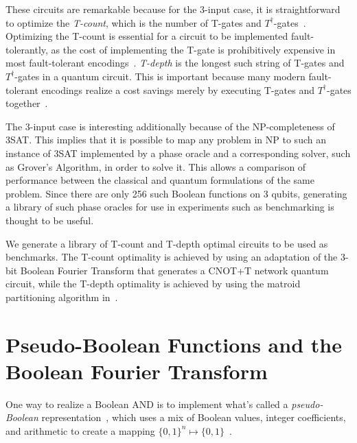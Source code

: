 \documentclass[a4paper]{article}
\begin{document}
These circuits are remarkable because for the 3-input case, it is straightforward to optimize
the {\it T-count}, which is the number of T-gates and $T^{\dagger}$-gates~\cite{bib-amy-meet-in-middle}.
Optimizing the T-count is essential for a circuit to be implemented fault-tolerantly, as
the cost of implementing the T-gate is prohibitively expensive in most fault-tolerant
encodings~\cite{bib-herr-lattice,bib-fowler-bridge}. {\it T-depth} is the longest such
string of T-gates and $T^{\dagger}$-gates in a quantum circuit. This is important because many modern
fault-tolerant encodings realize a cost savings merely by executing T-gates and $T^{\dagger}$-gates
together~\cite{bib-google-ecc}.

The 3-input case is interesting additionally because of the NP-completeness of 3SAT. This implies
that it is possible to map any problem in NP to such an instance of 3SAT implemented by a phase oracle
and a corresponding solver, such as Grover's Algorithm, in order to solve it. This allows a comparison
of performance between the classical and quantum formulations of the same problem. Since there are
only 256 such Boolean functions on 3 qubits, generating a library of such phase oracles for use in
experiments such as benchmarking is thought to be useful.

We generate a library of T-count and T-depth optimal circuits to be used as benchmarks. The T-count
optimality is achieved by using an adaptation of the 3-bit Boolean Fourier Transform that generates
a CNOT+T network quantum circuit, while the T-depth optimality is achieved by using the matroid partitioning
algorithm in~\cite{bib-amy-matroid}.

\section{Pseudo-Boolean Functions and the Boolean Fourier Transform}

One way to realize a Boolean AND is to implement what's called a {\it pseudo-Boolean}
representation~\cite{bib-barenco-elementary,bib-amy-cnot}, which uses a mix of
Boolean values, integer coefficients, and arithmetic to create a mapping $\{0,1\}^n \mapsto \{0,1\}$~\cite{bib-amy-rm}.
\end{document}
